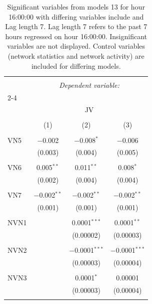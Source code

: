 
\begin{table}[!htbp] \centering 
  \caption{Significant variables from models 13 for hour 16:00:00 with differing variables include 
                               and Lag length 7. Lag length 7 refers to the past 7 hours regressed on hour 16:00:00. 
                               Insignificant variables are not displayed. 
                               Control variables (network statistics and network activity) are 
                               included for differing models.} 
  \label{Jmodels2_t_hourlagged3} 
\scriptsize 
\begin{tabular}{@{\extracolsep{5pt}}lccc} 
\\[-1.8ex]\hline 
\hline \\[-1.8ex] 
 & \multicolumn{3}{c}{\textit{Dependent variable:}} \\ 
\cline{2-4} 
\\[-1.8ex] & \multicolumn{3}{c}{JV} \\ 
\\[-1.8ex] & (1) & (2) & (3)\\ 
\hline \\[-1.8ex] 
 VN5 & $-$0.002 & $-$0.008$^{*}$ & $-$0.006 \\ 
  & (0.003) & (0.004) & (0.005) \\ 
  & & & \\ 
 VN6 & 0.005$^{**}$ & 0.011$^{**}$ & 0.008$^{*}$ \\ 
  & (0.002) & (0.004) & (0.004) \\ 
  & & & \\ 
 VN7 & $-$0.002$^{**}$ & $-$0.002$^{**}$ & $-$0.002$^{**}$ \\ 
  & (0.001) & (0.001) & (0.001) \\ 
  & & & \\ 
 NVN1 &  & 0.0001$^{***}$ & 0.0001$^{**}$ \\ 
  &  & (0.00002) & (0.00003) \\ 
  & & & \\ 
 NVN2 &  & $-$0.0001$^{***}$ & $-$0.0001$^{***}$ \\ 
  &  & (0.00003) & (0.00004) \\ 
  & & & \\ 
 NVN3 &  & 0.0001$^{*}$ & 0.00001 \\ 
  &  & (0.00003) & (0.00004) \\ 
  & & & \\ 

\end{tabular}
\end{table}
